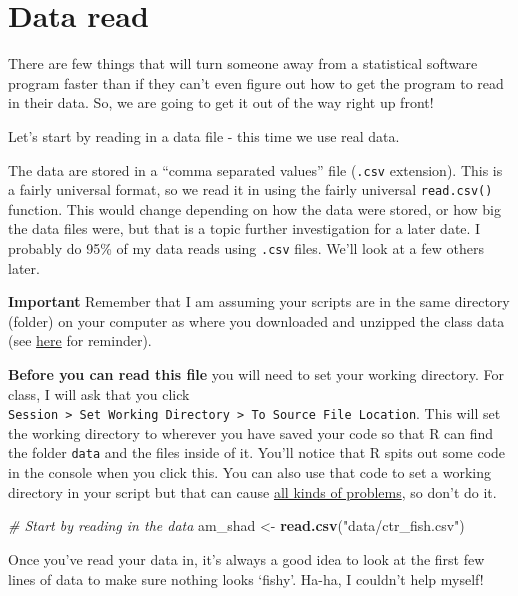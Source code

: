 \documentclass[
]{book}
\newenvironment{Shaded}{\begin{snugshade}}{\end{snugshade}}
\newcommand{\CommentTok}[1]{\textcolor[rgb]{0.56,0.35,0.01}{\textit{#1}}}
\newcommand{\KeywordTok}[1]{\textcolor[rgb]{0.13,0.29,0.53}{\textbf{#1}}}
\newcommand{\NormalTok}[1]{#1}
\newcommand{\StringTok}[1]{\textcolor[rgb]{0.31,0.60,0.02}{#1}}
\begin{document}
\hypertarget{data-read}{%
\section{Data read}\label{data-read}}

There are few things that will turn someone away from a statistical software program faster than if they can't even figure out how to get the program to read in their data. So, we are going to get it out of the way right up front!

Let's start by reading in a data file - this time we use real data.

The data are stored in a ``comma separated values'' file (\texttt{.csv} extension). This is a fairly universal format, so we read it in using the fairly universal \texttt{read.csv()} function. This would change depending on how the data were stored, or how big the data files were, but that is a topic further investigation for a later date. I probably do 95\% of my data reads using \texttt{.csv} files. We'll look at a few others later.

\textbf{Important} Remember that I am assuming your scripts are in the same directory (folder) on your computer as where you downloaded and unzipped the class data (see \href{https://danstich.github.io/stich/classes/BIOL217/software.html}{here} for reminder).

\textbf{Before you can read this file} you will need to set your working directory. For class, I will ask that you click \texttt{Session\ \textgreater{}\ Set\ Working\ Directory\ \textgreater{}\ To\ Source\ File\ Location}. This will set the working directory to wherever you have saved your code so that R can find the folder \texttt{data} and the files inside of it. You'll notice that R spits out some code in the console when you click this. You can also use that code to set a working directory in your script but that can cause \href{https://support.rstudio.com/hc/en-us/articles/200711843-Working-Directories-and-Workspaces}{all kinds of problems}, so don't do it.

\begin{Shaded}
\begin{Highlighting}[]
\CommentTok{# Start by reading in the data}
\NormalTok{am_shad <-}\StringTok{ }\KeywordTok{read.csv}\NormalTok{(}\StringTok{"data/ctr_fish.csv"}\NormalTok{)}
\end{Highlighting}
\end{Shaded}

Once you've read your data in, it's always a good idea to look at the first few lines of data to make sure nothing looks `fishy'. Ha-ha, I couldn't help myself!
\end{document}
